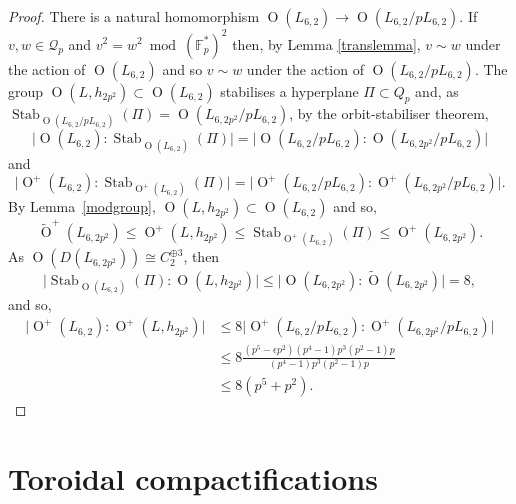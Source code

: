 \documentclass[11pt]{amsart}
\newcommand{\FF}{\mathbb{F}}
\newcommand{\qc}{\mathcal{Q}}
\newcommand{\opn}{\operatorname}
\newcommand{\op}{\oplus}
\begin{document}
\begin{proof}
There is a natural homomorphism $\opn{O}(L_{6,2}) \rightarrow \opn{O}(L_{6,2}/pL_{6,2})$.
If $v, w \in \qc_p$ and $v^2 = w^2 \bmod{ (\FF_p^*)^2}$ then, by Lemma \ref{translemma}, $v \sim w$ under the action of $\opn{O}(L_{6,2})$ and so $v \sim w$ under the action of $\opn{O}(L_{6,2}/pL_{6,2})$.
The group $\opn{O}(L, h_{2p^2}) \subset \opn{O}(L_{6,2})$ stabilises a hyperplane $\Pi \subset Q_p$ and, as $\opn{Stab}_{\opn{O}(L_{6,2} /p L_{6,2})}(\Pi) = \opn{O}(L_{6,2p^2} /p L_{6,2})$, by the orbit-stabiliser theorem, 
\begin{equation*}
\vert \opn{O}(L_{6,2}) : \opn{Stab}_{ \opn{O}(L_{6,2})} (\Pi) \vert = \vert \opn{O}(L_{6,2} /p L_{6,2}) : \opn{O}(L_{6,2p^2} /p L_{6,2}) \vert
\end{equation*}
and
\begin{equation*}
\vert \opn{O}^+(L_{6,2}) : \opn{Stab}_{ \opn{O}^+(L_{6,2})} (\Pi) \vert = \vert \opn{O}^+(L_{6,2} /p L_{6,2}) : \opn{O}^+(L_{6,2p^2} /p L_{6,2}) \vert.
\end{equation*}
By Lemma~\ref{modgroup}, $\opn{O}(L, h_{2p^2}) \subset \opn{O}(L_{6,2})$ and so, 
\begin{equation*}
\widetilde{\opn{O}}^+(L_{6,2p^2}) \leq \opn{O}^+(L, h_{2p^2}) \leq \opn{Stab}_{ \opn{O}^+(L_{6,2})}(\Pi) \leq \opn{O}^+(L_{6,2p^2}).
\end{equation*}
As $\opn{O}(D(L_{6,2p^2})) \cong C_2^{\op 3}$, then
\begin{equation}\label{stabindex}
\vert \opn{Stab}_{ \opn{O}(L_{6,2})}(\Pi) : \opn{O}(L, h_{2p^2}) \vert \leq \vert \opn{O}(L_{6,2p^2}) : \widetilde{\opn{O}}(L_{6,2p^2}) \vert = 8,
\end{equation}
and so,
\begin{align*}
 \vert \opn{O}^+(L_{6,2}) : \opn{O}^+(L, h_{2p^2}) \vert 	
& \leq 8 \vert \opn{O}^+(L_{6,2} /p L_{6,2}) : \opn{O}^+(L_{6,2p^2} /p L_{6,2}) \vert \\
& \leq 8 \frac{(p^5 - \epsilon p^2)(p^4 -1)p^3(p^2 -1)p }{(p^4-1)p^3(p^2 -1) p} \\
& \leq 8 (p^5 + p^2).
\end{align*}
\end{proof}
\section{Toroidal compactifications}
\end{document}

